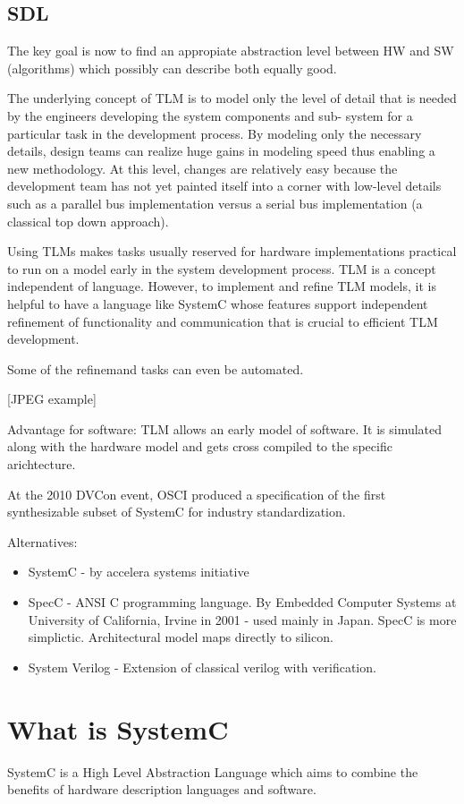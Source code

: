 \documentclass{article}
\begin{document}
	\subsection{SDL}
	The key goal is now to find an appropiate abstraction level between HW and SW (algorithms) which possibly can describe both equally good.  
		
	The underlying concept of TLM is to model only the level of detail that is needed by the engineers developing the system components and sub- system for a particular task in the development process. By modeling only the necessary details, design teams can realize huge gains in modeling speed thus enabling a new methodology. At this level, changes are relatively easy because the development team has not yet painted itself into a corner with low-level details such as a parallel bus implementation versus a serial bus implementation (a classical top down approach).
	
	Using TLMs makes tasks usually reserved for hardware implementations practical to run on a model early in the system development process. TLM is a concept independent of language. However, to implement and refine TLM models, it is helpful to have a language like SystemC whose features support independent refinement of functionality and communication that is crucial to efficient TLM development.
	
	Some of the refinemand tasks can even be automated.
	
	[JPEG example]
		
	Advantage for software: TLM allows an early model of software. It is simulated along with the hardware model and gets cross compiled to the specific arichtecture.
	
	At the 2010 DVCon event, OSCI produced a specification of the first synthesizable subset of SystemC for industry standardization.
	
	Alternatives:
	\begin{itemize}
		\item SystemC - by accelera systems initiative
		\item SpecC - ANSI C programming language. By Embedded Computer Systems at University of California, Irvine in 2001 - used mainly in Japan. SpecC is more simplictic. Architectural model maps directly to silicon.
		\item System Verilog - Extension of classical verilog with verification.
	\end{itemize}
	
	
	\section{What is SystemC}
	SystemC is a High Level Abstraction Language which aims to combine the benefits of hardware description languages and software.
	
\end{document}
